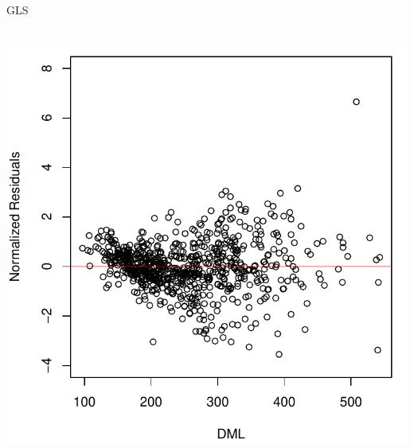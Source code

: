 \documentclass{beamer}\usepackage[]{graphicx}\usepackage[]{color}
\newenvironment{knitrout}{}{} %
\renewenvironment{knitrout}{\setlength{\topsep}{0mm}}{}
\begin{document}
\begin{frame}[fragile]{GLS}
\begin{columns}[c]
\begin{knitrout}
\includegraphics[width=0.7\linewidth]{figure/glsp1-2} 

\end{knitrout}

\end{columns}

\end{frame}
\end{document}
